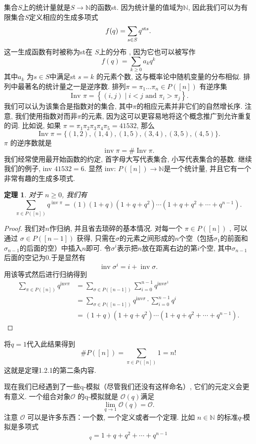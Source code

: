 \documentclass[a4paper,12pt]{ctexbook}
\newtheorem{theorem}[lemma]{\hspace{2em}定理}%
\begin{document}
集合$S$上的{\kaishu 统计量}就是$S\rightarrow \mathbb{N}$的函数st. 因为统计量的值域为$\mathbb{N}$, 因此我们可以为有限集合$S$定义相应的生成多项式
$$
f(q)=\sum_{s \in S} q^{{\rm st} s} .
$$
这一生成函数有时被称为st在 $S$上的{\kaishu 分布 }, 因为它也可以被写作
$$
f(q)=\sum_{k \geq 0} a_{k} q^{k}
$$
其中$a_{k}$ 为$s \in S$中满足st $s=k$ 的元素个数, 这与概率论中随机变量的分布相似. 排列中最著名的统计量之一是逆序数.  排列$\pi=\pi_{1} \ldots \pi_{n} \in P([n])$ 有{\kaishu 逆序集}
$$
\text { Inv } \pi=\left\{(i, j) \mid i<j \text { and } \pi_{i}>\pi_{j}\right\} .
$$
我们可以认为该集合是指数对的集合, 其中$\pi$的相应元素并非它们的自然增长序. 注意, 我们使用指数对而非$\pi$的元素, 因为这可以更容易地将这个概念推广到允许重复的词. 比如说, 如果 $\pi=\pi_{1} \pi_{2} \pi_{3} \pi_{4} \pi_{5}=41532$, 那么
$$
\operatorname{Inv} \pi=\{(1,2),(1,4),(1,5),(3,4),(3,5),(4,5)\} .
$$
 $\pi$ 的{\kaishu 逆序数}就是
$$
\operatorname{inv} \pi=\# \operatorname{Inv} \pi .
$$
我们经常使用最开始函数的约定, 首字母大写代表集合, 小写代表集合的基数. 继续我们的例子,  inv $41532=6$. 显然 inv: $P([n]) \rightarrow \mathbb{N}$是一个统计量, 并且它有一个非常有趣的生成多项式.
\begin{theorem}
对于 $n \geq 0$, 我们有
 $$
\sum_{\pi \in P([n])} q^{\operatorname{inv} \pi}=(1)(1+q)\left(1+q+q^{2}\right) \cdots\left(1+q+q^{2}+\cdots+q^{n-1}\right).
$$
\end{theorem}

\begin{proof}
	我们对$n$作归纳, 并且省去琐碎的基本情况. 对每一个 $\pi \in P([n])$ , 可以通过 $\sigma \in P([n-1])$ 获得, 只需在$\sigma$的元素之间形成的$n$个空（包括$\sigma_{1}$的前面和$\sigma_{n-1}$的后面的空）中插入$n$即可. 令$\sigma^{i}$表示把$n$放在距离右边的第$i$个空, 其中$\sigma_{n-1}$后面的空记为0.于是显然有
	$$
	\operatorname{inv} \sigma^{i}=i+\operatorname{inv} \sigma.
	$$用该等式然后进行归纳得到
	$$
	\begin{aligned}
	\sum_{\pi \in P([n])} q^{\mathrm{inv} \pi} &=\sum_{\sigma \in P([n-1])} \sum_{i=0}^{n-1} q^{\mathrm{inv} \sigma^{1}} \\
	&=\sum_{\sigma \in P([n-1])} q^{\mathrm{inv} \sigma} \cdot \sum_{i=0}^{n-1} q^{i} \\
	&=(1+q)\left(1+q+q^{2}\right) \cdots\left(1+q+q^{2}+\cdots+q^{n-1}\right).
	\end{aligned}
	$$
\end{proof}
将$q=1$代入此结果得到$$
\# P([n])=\sum_{\pi \in P([n])} 1=n !
$$
这就是定理1.2.1的第二条内容.

现在我们已经遇到了一些q-模拟（尽管我们还没有这样命名）, 它们的元定义会更有意义. 一个组合对象$\mathcal{O}$ 的{\kaishu q-模拟}就是 $\mathcal{O}(q)$满足
$$
\lim _{q \rightarrow 1} \mathcal{O}(q)=\mathcal{O}.
$$
注意 $\mathcal{O}$ 可以是许多东西：一个数, 一个定义或者一个定理. 比如 $n \in \mathbb{N}$ 的标准$q$-模拟是多项式
\begin{equation}
	[n]_{q}=1+q+q^{2}+\cdots+q^{n-1}\tag{3.2}
\end{equation}
\end{document}
